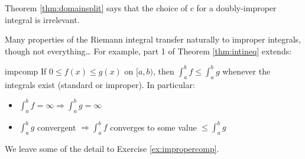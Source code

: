 Theorem \ref{thm:domainsplit} says that the choice of $c$ for a doubly-improper integral is irrelevant.\medbreak

Many properties of the Riemann integral transfer naturally to improper integrals, though not everything\ldots{} For example, part 1 of Theorem \ref{thm:intineq} extends:

\begin{thm}{}{impcomp}
	If $0\le f(x)\le g(x)$ on $[a,b)$, then $\int_a^bf\le\int_a^bg$ whenever the integrals exist (standard or improper). In particular:
	\begin{itemize}
	  \item $\int_a^bf=\infty\Longrightarrow\int_a^bg=\infty$
	  \item $\int_a^bg$ convergent $\Longrightarrow \int_a^bf$ converges to some value $\le \int_a^bg$
	\end{itemize}
\end{thm}

We leave some of the detail to Exercise \ref{ex:impropercomp}.

\vfil\pagebreak

